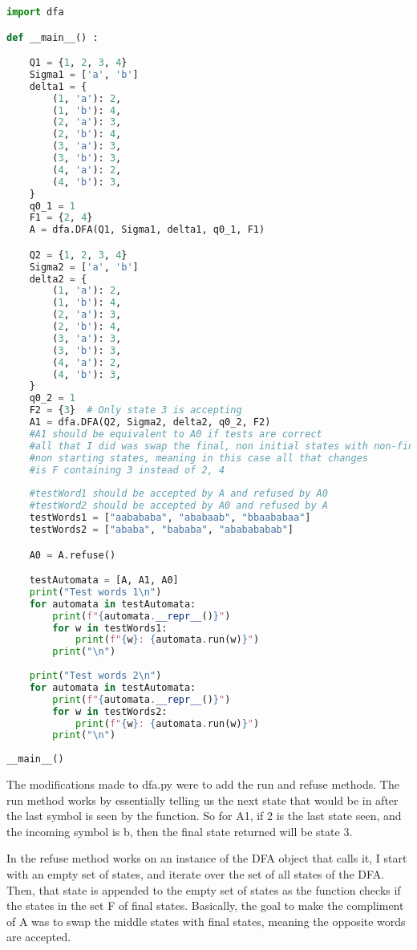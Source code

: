\documentclass{article}
\theoremstyle{theorem}
\theoremstyle{definition}
\theoremstyle{remark}
\begin{document}
\begin{lstlisting}[language=Python]
import dfa

def __main__() :

    Q1 = {1, 2, 3, 4}
    Sigma1 = ['a', 'b']
    delta1 = {
        (1, 'a'): 2,
        (1, 'b'): 4,
        (2, 'a'): 3,
        (2, 'b'): 4,
        (3, 'a'): 3,
        (3, 'b'): 3,
        (4, 'a'): 2,
        (4, 'b'): 3,
    }
    q0_1 = 1
    F1 = {2, 4}  
    A = dfa.DFA(Q1, Sigma1, delta1, q0_1, F1)

    Q2 = {1, 2, 3, 4}
    Sigma2 = ['a', 'b']
    delta2 = {
        (1, 'a'): 2,
        (1, 'b'): 4,
        (2, 'a'): 3,
        (2, 'b'): 4,
        (3, 'a'): 3,
        (3, 'b'): 3,
        (4, 'a'): 2,
        (4, 'b'): 3,
    }
    q0_2 = 1
    F2 = {3}  # Only state 3 is accepting
    A1 = dfa.DFA(Q2, Sigma2, delta2, q0_2, F2)
    #A1 should be equivalent to A0 if tests are correct
    #all that I did was swap the final, non initial states with non-final
    #non starting states, meaning in this case all that changes
    #is F containing 3 instead of 2, 4
    
    #testWord1 should be accepted by A and refused by A0
    #testWord2 should be accepted by A0 and refused by A
    testWords1 = ["aabababa", "ababaab", "bbaababaa"]
    testWords2 = ["ababa", "bababa", "ababababab"]

    A0 = A.refuse()

    testAutomata = [A, A1, A0]
    print("Test words 1\n")
    for automata in testAutomata:
        print(f"{automata.__repr__()}")
        for w in testWords1:
            print(f"{w}: {automata.run(w)}")
        print("\n")
    
    print("Test words 2\n")
    for automata in testAutomata:
        print(f"{automata.__repr__()}")
        for w in testWords2:
            print(f"{w}: {automata.run(w)}")
        print("\n")
        
__main__()
\end{lstlisting}

The modifications made to dfa.py were to add the run and refuse methods.  The run method works by essentially telling us the next
state that would be in after the last symbol is seen by the function.  So for A1, if 2 is the last state seen, and the incoming symbol is b, then the final state returned will be state 3.

In the refuse method works on an instance of the DFA object that calls it,  I start with an empty set of states,  and iterate over the set of all states of the DFA.  Then,  that state is appended to the empty set of states as the function checks if the states in the set F of final states.  Basically,  the goal to make the compliment of A was to swap the middle states with final states, meaning the opposite words are accepted.
\end{document}
